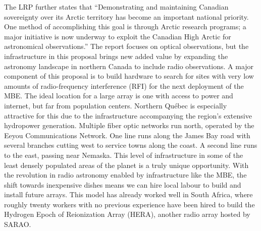 \documentclass[11pt]{article}
\newcommand{\mbe}{{\rm MBE}}
\begin{document}
The LRP further states that ``Demonstrating and maintaining Canadian
sovereignty over its Arctic territory has become an important national
priority. One method of accomplishing this goal is through Arctic
research programs; a major initiative is now underway to exploit the
Canadian High Arctic for astronomical observations.''  The report
focuses on optical observations, but the infrastructure in this
proposal brings new added value by expanding the astronomy landscape
in northern Canada to include radio observations.  A major component
of this proposal is to build hardware to search for sites with very
low amounts of radio-frequency interference (RFI) for the next
deployment of the \mbe.  The ideal location for a large array is one
with access to power and internet, but far from population centers.
Northern Qu\'ebec is especially attractive for this due to the
infrastructure accompanying the region's extensive hydropower
generation.  Multiple fiber optic networks run north, operated by the
Eeyou Communications Network.  One line runs along the James Bay road
with several branches cutting west to service towns along the coast.
A second line runs to the east, passing near Nemaska.  This level of
infrastructure in some of the least densely populated areas of the
planet is a truly unique opportunity.  With the revolution in radio
astronomy enabled by infrastructure like the \mbe, the shift towards
inexpensive dishes means we can hire local labour to build and install
future arrays.  This model has already worked well in South Africa,
where roughly twenty workers with no previous experience have been
hired to build the Hydrogen Epoch of Reionization Array (HERA),
another radio array hosted by SARAO.
\end{document}
